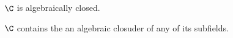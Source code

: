 \begin{theorem}\label{1.5.5}
    $\C$ is algebraically closed.
\end{theorem}
\begin{corollary}
    $\C$ contains the an algebraic closuder of any of its subfields.
\end{corollary}
